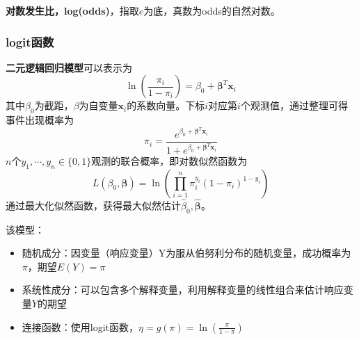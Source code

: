 \textbf{对数发生比，log(odds)}，指取$e$为底，真数为odds的自然对数。

\subsubsection{logit函数}

\textbf{二元逻辑回归模型}可以表示为
\begin{equation}
    \ln \left(\frac{\pi_i}{1-\pi_i}\right) = \beta_0 + \bm{\beta}^T \mathbf{x}_i
\end{equation}
其中$\beta_0$为截距，$\beta$为自变量$\mathbf{x}_i$的系数向量。下标$i$对应第$i$个观测值，通过整理可得事件出现概率为
\begin{equation}
    \pi_i = \frac{e^{\beta_0 + \bm{\beta}^T \mathbf{x}_i}}{1+e^{\beta_0 + \bm{\beta}^T \mathbf{x}_i}}
\end{equation}
$n$个$y_1,\cdots,y_n\in \{0,1\}$观测的联合概率，即对数似然函数为
\begin{equation}
    L(\beta_0,\bm{\beta}) = \ln \left(\prod_{i=1}^n \pi_i^{y_i}(1-\pi_i)^{1-y_i}\right)
\end{equation}
通过最大化似然函数，获得最大似然估计$\hat{\beta}_0,\hat{\bm{\beta}}$。

该模型：
\begin{itemize}[itemsep=0pt,parsep=0pt]
    \item 随机成分：因变量（响应变量）Y为服从伯努利分布的随机变量，成功概率为$\pi$，期望$E(Y)= \pi$
    \item 系统性成分：可以包含多个解释变量，利用解释变量的线性组合来估计响应变量$Y$的期望
    \item 连接函数：使用logit函数，$\eta = g(\pi) = \ln \left(\frac{\pi}{1-\pi}\right)$
\end{itemize}

